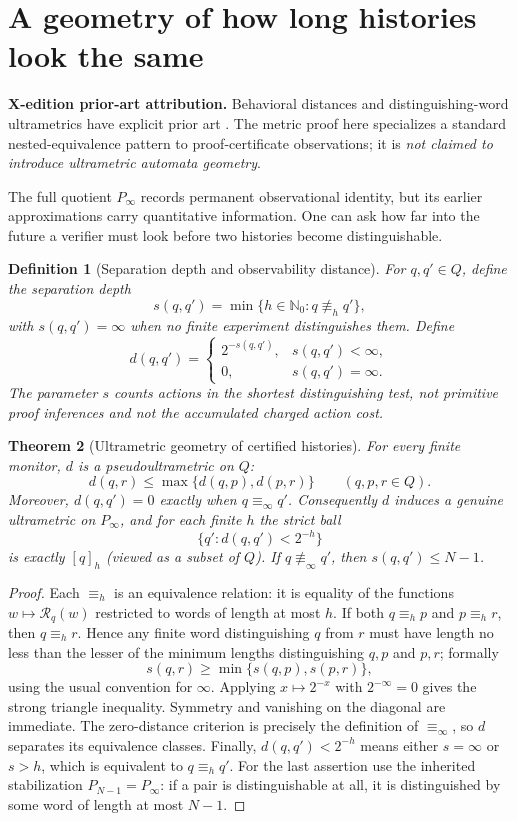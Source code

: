 \documentclass[11pt,letterpaper]{article}
\newcommand{\PriorArtNote}[1]{%
\par\smallskip\noindent\begin{minipage}{\linewidth}\small\color{black!85}%
\textbf{X-edition prior-art attribution.} #1\end{minipage}\par\smallskip}
\newtheorem{theorem}{Theorem}[section]
\newtheorem{definition}[theorem]{Definition}
\newcommand{\Nzero}{\mathbb{N}_0}
\newcommand{\R}{\mathcal{R}}
\newcommand{\eqk}[1]{\equiv_{#1}}
\newcommand{\eqinf}{\equiv_{\infty}}
\begin{document}
\section{A geometry of how long histories look the same}
\PriorArtNote{Behavioral distances and distinguishing-word ultrametrics have explicit prior art \cite{bonchi,ilchev}. The metric proof here specializes a standard nested-equivalence pattern to proof-certificate observations; it is \emph{not claimed to introduce ultrametric automata geometry}.}
The full quotient $P_\infty$ records permanent observational identity, but its earlier approximations carry quantitative information. One can ask how far into the future a verifier must look before two histories become distinguishable.

\begin{definition}[Separation depth and observability distance]\label{def:depth}
For $q,q'\in Q$, define the \emph{separation depth}
\[
 s(q,q')=\min\{h\in\Nzero:q\not\eqk{h}q'\},
\]
with $s(q,q')=\infty$ when no finite experiment distinguishes them. Define
\[
 d(q,q')=\begin{cases}2^{-s(q,q')},&s(q,q')<\infty,\\0,&s(q,q')=\infty.\end{cases}
\]
The parameter $s$ counts actions in the \emph{shortest distinguishing test}, not primitive proof inferences and not the accumulated charged action cost.
\end{definition}

\begin{theorem}[Ultrametric geometry of certified histories]\label{thm:ultra}
For every finite monitor, $d$ is a pseudoultrametric on $Q$:
\[
 d(q,r)\le\max\{d(q,p),d(p,r)\} \qquad(q,p,r\in Q).
\]
Moreover, $d(q,q')=0$ exactly when $q\eqinf q'$. Consequently $d$ induces a genuine ultrametric on $P_\infty$, and for each finite $h$ the strict ball
\[
 \{q':d(q,q')<2^{-h}\}
\]
is exactly $[q]_h$ (viewed as a subset of $Q$). If $q\not\eqinf q'$, then $s(q,q')\le N-1$.
\end{theorem}
\begin{proof}
Each $\eqk{h}$ is an equivalence relation: it is equality of the functions $w\mapsto\R_q(w)$ restricted to words of length at most $h$. If both $q\eqk{h}p$ and $p\eqk{h}r$, then $q\eqk{h}r$. Hence any finite word distinguishing $q$ from $r$ must have length no less than the lesser of the minimum lengths distinguishing $q,p$ and $p,r$; formally
\[
 s(q,r)\ge\min\{s(q,p),s(p,r)\},
\]
using the usual convention for $\infty$. Applying $x\mapsto2^{-x}$ with $2^{-\infty}=0$ gives the strong triangle inequality. Symmetry and vanishing on the diagonal are immediate. The zero-distance criterion is precisely the definition of $\eqinf$, so $d$ separates its equivalence classes. Finally, $d(q,q')<2^{-h}$ means either $s=\infty$ or $s>h$, which is equivalent to $q\eqk{h}q'$. For the last assertion use the inherited stabilization $P_{N-1}=P_\infty$: if a pair is distinguishable at all, it is distinguished by some word of length at most $N-1$.
\end{proof}
\end{document}
